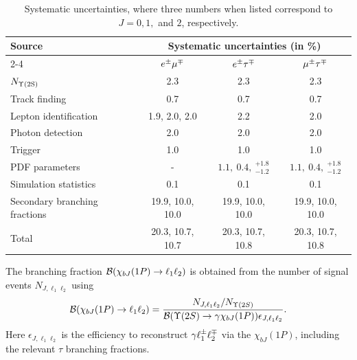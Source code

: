 \documentclass[aps,prl,twocolumn,superscriptaddress,showpacs,preprintnumbers,amsmath,amssymb, nofootinbib]{revtex4-2}
\begin{document}
\begin{table}[htbp]
  \begin{center}
    \begin{tabular}{l|c|c|c}
      \hline\hline
      \multirow{2}{*}{Source} & \multicolumn{3}{c}{Systematic uncertainties (in \%)} \\
      \cline{2-4}
                            & $e^\pm \mu^\mp$              & $e^\pm \tau^\mp$                    & $\mu^\pm \tau^\mp$                    \\\hline
      $N_{\rm \Upsilon(2S)}$               & 2.3              & 2.3                      &2.3                       \\ \hline
      Track finding         & 0.7              & 0.7                      & 0.7                      \\ \hline
      Lepton identification & 1.9, 2.0, 2.0    & 2.2                      & 2.0                      \\ \hline
      Photon detection      & 2.0              & 2.0                      & 2.0                      \\ \hline
      Trigger               & 1.0              & 1.0                      & 1.0                      \\ \hline
      PDF parameters        &                - & $1.1,~0.4,~^{+1.8}_{-1.2}$ & $1.1,~0.4,~^{+1.8}_{-1.2}$ \\ \hline
      Simulation statistics & 0.1              & 0.1                      & 0.1                      \\ \hline
      Secondary branching fractions     & 19.9, 10.0, 10.0 & 19.9, 10.0, 10.0         & 19.9, 10.0, 10.0         \\ \hline
      Total                 & 20.3, 10.7, 10.7 & 20.3, 10.7, 10.8         & 20.3, 10.7, 10.8         \\ \hline\hline
    \end{tabular}
  \end{center}
  \caption{Systematic uncertainties, where three numbers when listed correspond to $J=0, 1,$ and $2$, respectively.}
  \label{tab:syst}
\end{table}


The branching fraction $\mathcal{B}(\chi_{bJ}(1P)\to\ell_1\ell_2)$ is obtained from the number of signal events $N_{J, \ell_1\ell_2}$ using
\begin{equation}
\mathcal{B}(\chi_{bJ}(1P)\to\ell_1\ell_2) = \frac{N_{J, \ell_1\ell_2}/N_{\Upsilon(2S)}}{\mathcal{B}(\Upsilon(2S)\rightarrow\gamma\chi_{bJ}(1P))\epsilon_{J, \ell_1\ell_2}}.
\label{equ:ul}
\end{equation}
Here $\epsilon_{J, \ell_1\ell_2}$ is the efficiency to reconstruct $\gamma\ell_1^\pm\ell_2^\mp$ via the $\chi_{bJ}(1P)$, including the relevant $\tau$ branching fractions.
\end{document}
